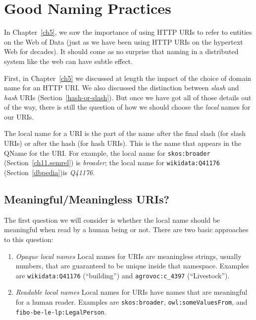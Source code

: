 

\section{Good Naming Practices}

In Chapter~\ref{ch5}, we saw the importance of using HTTP URIs to refer to entities
on the Web of Data (just as we have been using HTTP URIs on the hypertext Web for decades).
It should come as no surprise that naming in a distributed system like the web
can have subtle effect. 

First, in Chapter~\ref{ch5} we discussed at length the impact of the choice of 
domain name for an HTTP URI.   We also discussed the distinction between \emph{slash} and 
\emph{hash} URIs (Section~\ref{hash-or-slash}).  But once we have got all of those details 
out of the way, there is still the question of how we should choose the \emph{local} names 
for our URIs. 

The local name for a URI is the part of the name after the final slash (for slash URIs) or 
after the hash (for hash URIs).  This is the name that appears in the QName for the URI. 
For example, the local name for \texttt{skos:broader}  (Section~\ref{ch11.semrel}) is 
\emph{broader}; the local name for \texttt{wikidata:Q41176} (Section~\ref{dbpedia})is 
\emph{Q41176}. 

\subsection{Meaningful/Meaningless URIs?}

The first question we will consider is whether the local name should be meaningful
when read by a human being or not.  There are two basic approaches to this question: 

\begin{enumerate}
    \item \emph{Opaque local names} Local names for URIs are meaningless strings, usually numbers, that are guaranteed to be unique inside that namespace.  Examples are \texttt{wikidata:Q41176} (``building'') and \texttt{agrovoc:c\_4397} (``Livestock''). 
    \item \emph{Readable local names} Local names for URIs have names that are meaningful
    for a human reader.  Examples are \texttt{skos:broader}, \texttt{owl:someValuesFrom}, and \texttt{fibo-be-le-lp:LegalPerson}.
\end{enumerate}

